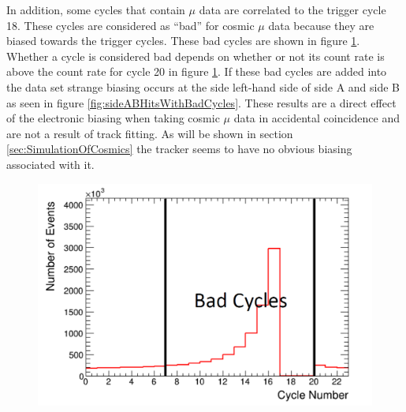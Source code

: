 In addition, some cycles that contain $\mu$ data are correlated to the trigger cycle 18. These cycles are considered as ``bad'' for cosmic $\mu$ data because they are biased towards the trigger cycles. These bad cycles are shown in figure \ref{fig:badCycles}. Whether a cycle is considered bad depends on whether or not its count rate is above the count rate for cycle 20 in figure \ref{fig:badCycles}. If these bad cycles are added into the data set strange biasing occurs at the side left-hand side of side A and side B as seen in figure \ref{fig:sideABHitsWithBadCycles}. These results are a direct effect of the electronic biasing when taking cosmic $\mu$ data in accidental coincidence and are not a result of track fitting. As will be shown in section \ref{sec:SimulationOfCosmics} the tracker seems to have no obvious biasing associated with it. %

\begin{figure}[!h]
 \centering
 \includegraphics[width=0.7\linewidth]{Chapter5/Figs/Raster/badCycles.png}
 \label{fig:badCycles}
\end{figure}

